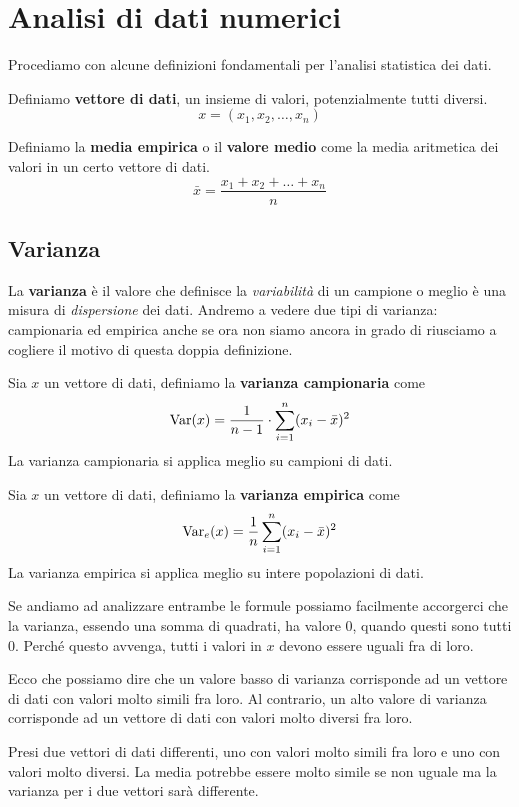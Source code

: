 \chapter{Analisi di dati numerici}
Procediamo con alcune definizioni fondamentali per l'analisi statistica dei dati.

\begin{definition} \label{vettore}
	Definiamo \textbf{vettore di dati}, un insieme di valori, potenzialmente tutti diversi.
	\[ x = (x_1, x_2, \dots, x_n) \]
\end{definition}

\begin{definition}
	Definiamo la \textbf{media empirica} o il \textbf{valore medio} come la media aritmetica dei
	valori in un certo vettore di dati.
	\[ \bar{x} = \frac{x_1 + x_2 + \dots + x_n}{n} \]
\end{definition}

\section{Varianza}
La \textbf{varianza} è il valore che definisce la \emph{variabilità} di un campione o meglio è una
misura di \emph{dispersione} dei dati. Andremo a vedere due tipi di varianza: campionaria ed
empirica anche se ora non siamo ancora in grado di riusciamo a cogliere il motivo di questa
doppia definizione.

\begin{definition}
	Sia $x$ un vettore di dati, definiamo la \textbf{varianza campionaria} come
	\[ \operatorname{Var}(x) = \frac{1}{n - 1} \cdot \sum_{i=1}^n (x_i - \bar{x})^2 \]
	La varianza campionaria si applica meglio su campioni di dati.
\end{definition}

\begin{definition}
	Sia $x$ un vettore di dati, definiamo la \textbf{varianza empirica} come
	\[ \operatorname{Var}_e(x) = \frac{1}{n} \sum_{i=1}^n (x_i - \bar{x})^2 \]
	La varianza empirica si applica meglio su intere popolazioni di dati.
\end{definition}

\begin{observation}
	Se andiamo ad analizzare entrambe le formule possiamo facilmente accorgerci che la varianza,
	essendo una somma di quadrati, ha valore 0, quando questi sono tutti 0. Perché questo avvenga,
	tutti i valori in $x$ devono essere uguali fra di loro.

	Ecco che possiamo dire che un valore basso di varianza corrisponde ad un vettore di dati con
	valori molto simili fra loro. Al contrario, un alto valore di varianza corrisponde ad un
	vettore di dati con valori molto diversi fra loro.

	Presi due vettori di dati differenti, uno con valori molto simili fra loro e uno con valori
	molto diversi. La media potrebbe essere molto simile se non uguale ma la varianza per i due
	vettori sarà differente.
\end{observation}

